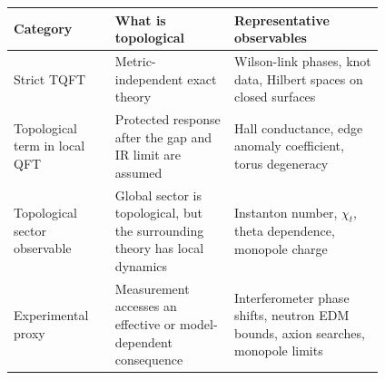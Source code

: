 \begingroup
\small
\renewcommand{\arraystretch}{1.35}
\begin{center}
\begin{tabular}{@{}p{0.20\linewidth}p{0.27\linewidth}p{0.34\linewidth}@{}}
\hline
Category & What is topological & Representative observables \\
\hline
Strict TQFT &
Metric-independent exact theory &
Wilson-link phases, knot data, Hilbert spaces on closed surfaces \\
\hline
Topological term in local QFT &
Protected response after the gap and IR limit are assumed &
Hall conductance, edge anomaly coefficient, torus degeneracy \\
\hline
Topological sector observable &
Global sector is topological, but the surrounding theory has local dynamics &
Instanton number, $\chi_t$, theta dependence, monopole charge \\
\hline
Experimental proxy &
Measurement accesses an effective or model-dependent consequence &
Interferometer phase shifts, neutron EDM bounds, axion searches, monopole limits \\
\hline
\end{tabular}
\end{center}
\endgroup
